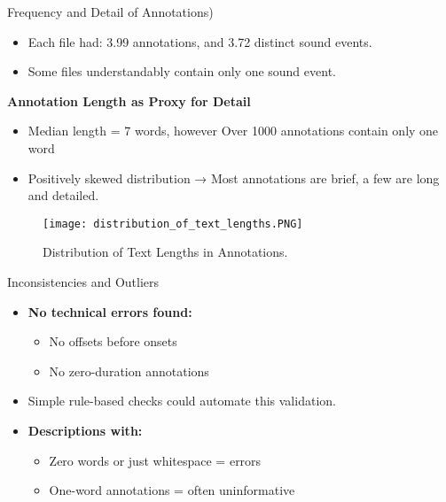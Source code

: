 \documentclass[aspectratio=169, 10pt]{beamer}
\begin{document}
\begin{frame}{Frequency and Detail of Annotations)}
    \begin{itemize}
        \item Each file had: 3.99 annotations, and 3.72 distinct sound events.
        \item Some files understandably contain only one sound event.
        \end{itemize}

        
        \item \textbf{Annotation Length as Proxy for Detail}
        \begin{itemize}
            \item Median length = 7 words, however Over 1000 annotations contain only one word
            \item Positively skewed distribution → Most annotations are brief, a few are long and detailed.
        \end{itemize}
\begin{figure}[h]
    \centering
    \texttt{[image: distribution\_of\_text\_lengths.PNG]}
    \caption{Distribution of Text Lengths in Annotations.}
    \label{fig:len}
\end{figure}
\end{frame}



\begin{frame}{Inconsistencies and Outliers}
    \begin{itemize}
        \item \textbf{No technical errors found:}
            \begin{itemize}
                \item No offsets before onsets
                \item No zero-duration annotations
            \end{itemize}
        \item Simple rule-based checks could automate this validation.
    \end{itemize}

\begin{itemize}
    \item \textbf{Descriptions with:}
    \begin{itemize}
        \item Zero words or just whitespace = errors
        \item One-word annotations = often uninformative
    \end{itemize}
\end{itemize}

\end{frame}
\end{document}
